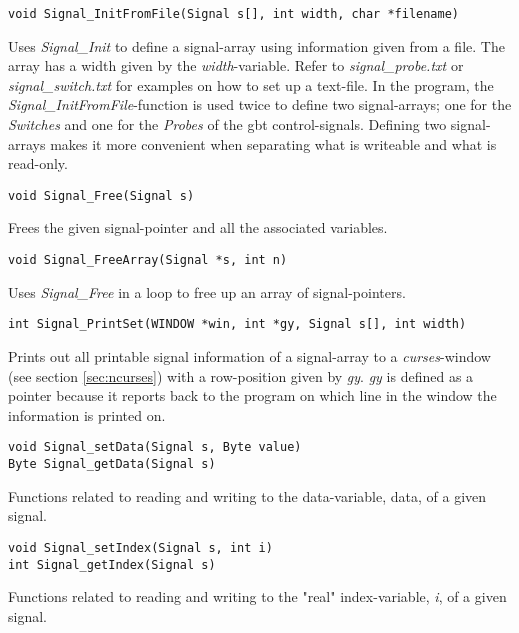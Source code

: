\documentclass[main.tex]{subfiles}
\begin{document}
\begin{lstlisting}[frame=single] 
void Signal_InitFromFile(Signal s[], int width, char *filename)
\end{lstlisting}
Uses \textit{Signal\_Init} to define a signal-array using information given from a file. The array has a width given by the \textit{width}-variable. Refer to \textit{signal\_probe.txt} or \textit{signal\_switch.txt} for examples on how to set up a text-file. In the program, the \textit{Signal\_InitFromFile}-function is used twice to define two signal-arrays; one for the \textit{Switches} and one for the \textit{Probes} of the \gls{gbt} control-signals. Defining two signal-arrays makes it more convenient when separating what is writeable and what is read-only.\\

\begin{lstlisting}[frame=single] 
void Signal_Free(Signal s)
\end{lstlisting}
Frees the given signal-pointer and all the associated variables.\\

\begin{lstlisting}[frame=single] 
void Signal_FreeArray(Signal *s, int n)
\end{lstlisting}
Uses \textit{Signal\_Free} in a loop to free up an array of signal-pointers.\\

\begin{lstlisting}[frame=single] 
int Signal_PrintSet(WINDOW *win, int *gy, Signal s[], int width)
\end{lstlisting}
Prints out all printable signal information of a signal-array to a \textit{curses}-window (see section \ref{sec:ncurses}) with a row-position given by \textit{gy}. \textit{gy} is defined as a pointer because it reports back to the program on which line in the window the information is printed on. \\

\begin{lstlisting}[frame=single] 
void Signal_setData(Signal s, Byte value)
Byte Signal_getData(Signal s)
\end{lstlisting}
Functions related to reading and writing to the data-variable, data, of a given signal.\\

\begin{lstlisting}[frame=single] 
void Signal_setIndex(Signal s, int i)
int Signal_getIndex(Signal s)
\end{lstlisting}
Functions related to reading and writing to the "real" index-variable, \textit{i}, of a given signal.\\
\end{document}
